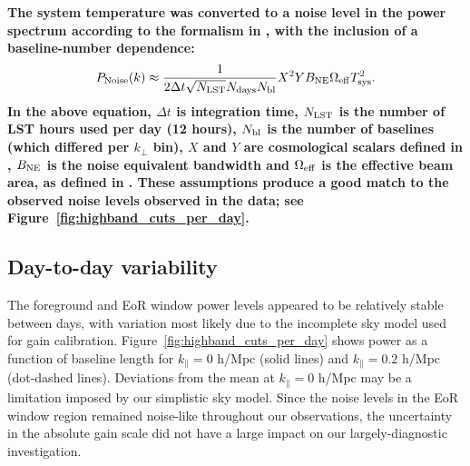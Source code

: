 \documentclass[twocolumn, trackchanges]{aastex61}
\newcommand{\edited}[1]{{\bf \color{red} #1}}
\begin{document}
\edited{The system temperature was converted to a noise level in the power spectrum according to the formalism in \cite{Parsons.12a}, with the inclusion of a baseline-number dependence:
\begin{equation}
P_{\rm Noise}(k) \approx \frac{1}{2\Delta t \sqrt{N_{\rm LST}} N_{\rm days} N_{\rm bl}} X^2 Y B_{\rm NE} \Omega_{\rm eff} T_{\rm sys}^2.
\end{equation}
In the above equation, $\Delta t$ is integration time, $N_{\rm LST}$ is the number of LST hours used per day (12 hours), $N_{\rm bl}$ is the number of baselines (which differed per $k_{\perp}$ bin), $X$ and $Y$ are cosmological scalars defined in \cite{Parsons.12a}, $B_{\rm NE}$ is the noise equivalent bandwidth and $\Omega_{\rm eff}$ is the effective beam area, as defined in \cite{Parsons14}.  These assumptions produce a good match to the observed noise levels observed in the data; see Figure~\ref{fig:highband_cuts_per_day}.}

\subsection{Day-to-day variability}
\label{subsec:variability}

The foreground and EoR window power levels appeared to be relatively stable between days, with variation most likely due to the incomplete sky model used for gain calibration. Figure~\ref{fig:highband_cuts_per_day} shows power as a function of baseline length for $k_{\parallel}=0$ h/Mpc (solid lines) and $k_{\parallel}=0.2$ h/Mpc (dot-dashed lines). Deviations from the mean at $k_{\parallel}=0$ h/Mpc may be a limitation imposed by our simplistic sky model. Since the noise levels in the EoR window region remained noise-like throughout our observations, the uncertainty in the absolute gain scale did not have a large impact on our largely-diagnostic investigation.
\end{document}
